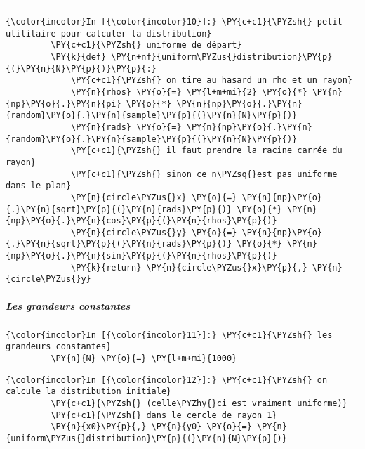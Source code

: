     \begin{center}\rule{0.5\linewidth}{\linethickness}\end{center}

    \begin{Verbatim}[commandchars=\\\{\}]
{\color{incolor}In [{\color{incolor}10}]:} \PY{c+c1}{\PYZsh{} petit utilitaire pour calculer la distribution}
         \PY{c+c1}{\PYZsh{} uniforme de départ}
         \PY{k}{def} \PY{n+nf}{uniform\PYZus{}distribution}\PY{p}{(}\PY{n}{N}\PY{p}{)}\PY{p}{:}
             \PY{c+c1}{\PYZsh{} on tire au hasard un rho et un rayon}
             \PY{n}{rhos} \PY{o}{=} \PY{l+m+mi}{2} \PY{o}{*} \PY{n}{np}\PY{o}{.}\PY{n}{pi} \PY{o}{*} \PY{n}{np}\PY{o}{.}\PY{n}{random}\PY{o}{.}\PY{n}{sample}\PY{p}{(}\PY{n}{N}\PY{p}{)}
             \PY{n}{rads} \PY{o}{=} \PY{n}{np}\PY{o}{.}\PY{n}{random}\PY{o}{.}\PY{n}{sample}\PY{p}{(}\PY{n}{N}\PY{p}{)}
             \PY{c+c1}{\PYZsh{} il faut prendre la racine carrée du rayon}
             \PY{c+c1}{\PYZsh{} sinon ce n\PYZsq{}est pas uniforme dans le plan}
             \PY{n}{circle\PYZus{}x} \PY{o}{=} \PY{n}{np}\PY{o}{.}\PY{n}{sqrt}\PY{p}{(}\PY{n}{rads}\PY{p}{)} \PY{o}{*} \PY{n}{np}\PY{o}{.}\PY{n}{cos}\PY{p}{(}\PY{n}{rhos}\PY{p}{)}
             \PY{n}{circle\PYZus{}y} \PY{o}{=} \PY{n}{np}\PY{o}{.}\PY{n}{sqrt}\PY{p}{(}\PY{n}{rads}\PY{p}{)} \PY{o}{*} \PY{n}{np}\PY{o}{.}\PY{n}{sin}\PY{p}{(}\PY{n}{rhos}\PY{p}{)}
             \PY{k}{return} \PY{n}{circle\PYZus{}x}\PY{p}{,} \PY{n}{circle\PYZus{}y}
\end{Verbatim}


    \hypertarget{les-grandeurs-constantes}{%
\subparagraph{Les grandeurs constantes}\label{les-grandeurs-constantes}}

    \begin{Verbatim}[commandchars=\\\{\}]
{\color{incolor}In [{\color{incolor}11}]:} \PY{c+c1}{\PYZsh{} les grandeurs constantes}
         \PY{n}{N} \PY{o}{=} \PY{l+m+mi}{1000}
\end{Verbatim}


    \begin{Verbatim}[commandchars=\\\{\}]
{\color{incolor}In [{\color{incolor}12}]:} \PY{c+c1}{\PYZsh{} on calcule la distribution initiale}
         \PY{c+c1}{\PYZsh{} (celle\PYZhy{}ci est vraiment uniforme)}
         \PY{c+c1}{\PYZsh{} dans le cercle de rayon 1}
         \PY{n}{x0}\PY{p}{,} \PY{n}{y0} \PY{o}{=} \PY{n}{uniform\PYZus{}distribution}\PY{p}{(}\PY{n}{N}\PY{p}{)}
\end{Verbatim}


